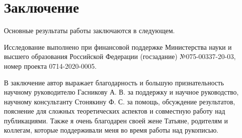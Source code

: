 \chapter*{Заключение}                       %


Основные результаты работы заключаются в следующем.


Исследование выполнено при финансовой поддержке Министерства науки
и высшего образования Российской Федерации (госзадание) №075-00337-20-03,
номер проекта 0714-2020-0005.

В заключение автор выражает благодарность и большую признательность научному руководителю Гасникову А. В. за поддержку и научное руководство, научному консультанту Стонякину Ф. С. за помощь, обсуждение результатов, пояснение для сложных теоретических аспектов и совместную работу над публикациями. Также я очень благодарен своей жене Татьяне, родителям и коллегам, которые поддерживали меня во время работы над рукописью. 
